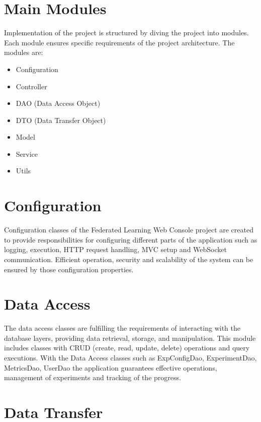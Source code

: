 \section{Main Modules}

Implementation of the project is structured by diving the project into modules. Each module ensures specific requirements of the project architecture. The modules are:\\
\begin{itemize}
    \item Configuration
    \item Controller
    \item DAO (Data Access Object)
    \item DTO (Data Transfer Object)
    \item Model
    \item Service
    \item Utils
\end{itemize}

\section{Configuration}

Configuration classes of the Federated Learning Web Console project are created to provide responsibilities for configuring different parts of the application such as
logging, execution, HTTP request handling, MVC setup and WebSocket communication. Efficient operation, security and scalability of the system can be ensured by those configuration properties.

\section{Data Access}

The data access classes are fulfilling the requirements of interacting with the database layers, providing data retrieval, storage, and manipulation. This module includes classes with CRUD
(create, read, update, delete) operations and query executions. With the Data Access classes such as ExpConfigDao, ExperimentDao, MetricsDao, UserDao the application guarantees effective operations,
management of experiments and tracking of the progress.


\section{Data Transfer}


